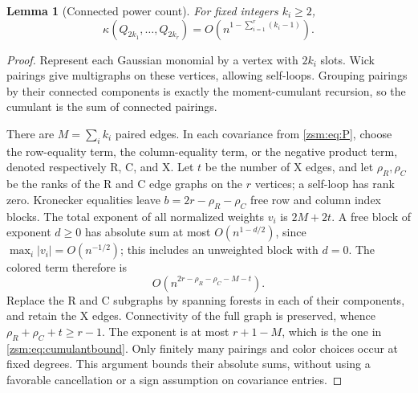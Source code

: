 \documentclass[11pt]{article}
\newtheorem{lemma}[theorem]{Lemma}
\theoremstyle{definition}\newtheorem{definition}[theorem]{Definition}
\theoremstyle{remark}\newtheorem{remark}[theorem]{Remark}
\begin{document}
\begin{lemma}[Connected power count]\label{zsm:lem:cumulants}
For fixed integers $k_i\ge2$,
\begin{equation}\label{zsm:eq:cumulantbound}
 \kappa(Q_{2k_1},\ldots,Q_{2k_r})
 =O\left(n^{1-\sum_{i=1}^r(k_i-1)}\right).
\end{equation}
\end{lemma}
\begin{proof}
Represent each Gaussian monomial by a vertex with $2k_i$ slots. Wick pairings
give multigraphs on these vertices, allowing self-loops. Grouping pairings by
their connected components is exactly the moment-cumulant recursion, so the
cumulant is the sum of connected pairings.

There are $M=\sum_i k_i$ paired edges. In each covariance from \eqref{zsm:eq:P},
choose the row-equality term, the column-equality term, or the negative product
term, denoted respectively R, C, and X. Let $t$ be the number of X edges, and
let $\rho_R,\rho_C$ be the ranks of the R and C edge graphs on the $r$ vertices;
a self-loop has rank zero. Kronecker equalities leave
$b=2r-\rho_R-\rho_C$ free row and column index blocks. The total exponent of
all normalized weights $v_i$ is $2M+2t$. A free block of exponent $d\ge0$ has
absolute sum at most $O(n^{1-d/2})$, since $\max_i|v_i|=O(n^{-1/2})$;
this includes an unweighted block with $d=0$. The colored term therefore is
\[
 O(n^{2r-\rho_R-\rho_C-M-t}).
\]
Replace the R and C subgraphs by spanning forests in each of their components,
and retain the X edges. Connectivity of the full graph is preserved, whence
$\rho_R+\rho_C+t\ge r-1$. The exponent is at most $r+1-M$, which is the
one in \eqref{zsm:eq:cumulantbound}. Only finitely many pairings and color choices
occur at fixed degrees. This argument bounds their absolute sums, without
using a favorable cancellation or a sign assumption on covariance entries.
\end{proof}
\end{document}
